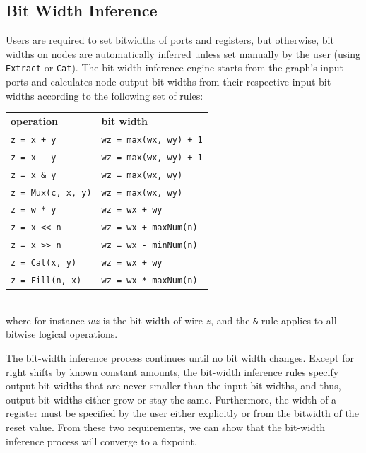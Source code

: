 \documentclass[10pt,twocolumn]{article}
\def\code#1{{\small\tt #1}}
\begin{document}

\subsection{Bit Width Inference}

Users are required to set bitwidths of ports and registers, but otherwise,
bit widths on nodes are automatically inferred unless set manually by
the user (using \code{Extract} or \code{Cat}).
The bit-width inference engine starts from the graph's input ports and 
calculates node output bit widths from their respective input bit widths according to the following set of rules:\\

{\small
\begin{tabular}{ll}
{\bf operation} & {\bf bit width} \\ 
\verb|z = x + y| & \verb|wz = max(wx, wy) + 1| \\
\verb+z = x - y+ & \verb|wz = max(wx, wy) + 1|\\
\verb+z = x & y+ & \verb+wz = max(wx, wy)+ \\
\verb+z = Mux(c, x, y)+ & \verb+wz = max(wx, wy)+ \\
\verb+z = w * y+ & \verb!wz = wx + wy! \\
\verb+z = x << n+ & \verb!wz = wx + maxNum(n)! \\
\verb+z = x >> n+ & \verb+wz = wx - minNum(n)+ \\
\verb+z = Cat(x, y)+ & \verb!wz = wx + wy! \\
\verb+z = Fill(n, x)+ & \verb+wz = wx * maxNum(n)+ \\
\end{tabular}
}
\\[1mm]
\noindent  
where for instance $wz$ is the bit width of wire $z$, and the \verb+&+
rule applies to all bitwise logical operations.

The bit-width inference process continues until no bit width changes.
Except for right shifts by known constant amounts, the bit-width
inference rules specify output bit widths that are never smaller than
the input bit widths, and thus, output bit widths either grow or stay
the same.  Furthermore, the width of a register must be specified by
the user either explicitly or from the bitwidth of the reset value.
From these two requirements, we can show that the bit-width inference
process will converge to a fixpoint.
\end{document}
